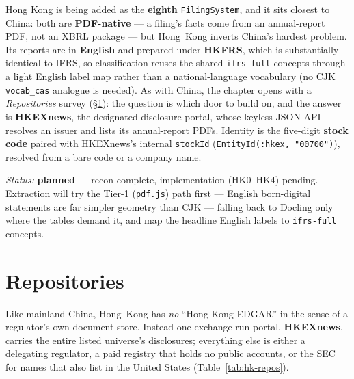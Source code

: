 \documentclass[11pt,a4paper]{report}
\begin{document}
Hong Kong is being added as the \textbf{eighth} \texttt{FilingSystem}, and it sits closest to China: both are
\textbf{PDF-native} --- a filing's facts come from an annual-report PDF, not an XBRL package --- but Hong~Kong
inverts China's hardest problem. Its reports are in \textbf{English} and prepared under \textbf{HKFRS}, which
is substantially identical to IFRS, so classification reuses the shared \texttt{ifrs-full} concepts through a
light English label map rather than a national-language vocabulary (no CJK \texttt{vocab\_cas} analogue is
needed). As with China, the chapter opens with a \emph{Repositories} survey (\S\ref{sec:hk-repos}): the
question is which door to build on, and the answer is \textbf{HKEXnews}, the designated disclosure portal,
whose keyless JSON API resolves an issuer and lists its annual-report PDFs. Identity is the five-digit
\textbf{stock code} paired with HKEXnews's internal \texttt{stockId} (\texttt{EntityId(:hkex, "00700")}),
resolved from a bare code or a company name.

\emph{Status:} \textbf{planned} --- recon complete, implementation (HK0--HK4) pending. Extraction will try the
Tier-1 (\texttt{pdf.js}) path first --- English born-digital statements are far simpler geometry than CJK ---
falling back to Docling only where the tables demand it, and map the headline English labels to
\texttt{ifrs-full} concepts.

\section{Repositories}\label{sec:hk-repos}

Like mainland China, Hong~Kong has \emph{no} ``Hong Kong EDGAR'' in the sense of a regulator's own document
store. Instead one exchange-run portal, \textbf{HKEXnews}, carries the entire listed universe's disclosures;
everything else is either a delegating regulator, a paid registry that holds no public accounts, or the SEC
for names that also list in the United States (Table~\ref{tab:hk-repos}).
\end{document}
